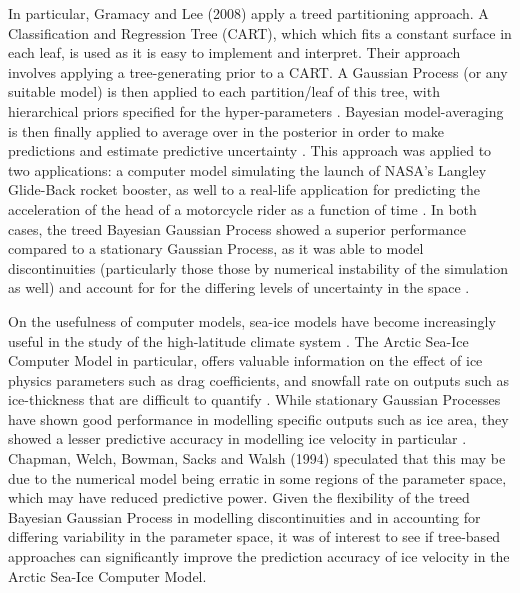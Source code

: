 \documentclass{article}\usepackage[]{graphicx}\usepackage[]{color}
\begin{document}
\vspace{1em}

In particular, Gramacy and Lee (2008) apply a treed partitioning approach. A Classification and Regression Tree (CART), which which fits a constant surface in each leaf, is used as it is easy to implement and interpret. Their approach involves applying a tree-generating prior to a CART. A Gaussian Process (or any suitable model) is then applied to each partition/leaf of this tree, with hierarchical priors specified for the hyper-parameters \cite{gramacy_lee_2008}. Bayesian model-averaging is then finally applied to average over in the posterior in order to make predictions and estimate predictive uncertainty \cite{gramacy_lee_2008}. This approach was applied to two applications: a computer model simulating the launch of NASA's Langley Glide-Back rocket booster, as well to a real-life application for predicting the acceleration of the head of a motorcycle rider as a function of time \cite{gramacy_lee_2008}. In both cases, the treed Bayesian Gaussian Process showed a superior performance compared to a stationary Gaussian Process, as it was able to model discontinuities (particularly those those by numerical instability of the simulation as well) and account for for the differing levels of uncertainty in the space \cite{gramacy_lee_2008}.

\vspace{1em}
On the usefulness of computer models, sea-ice models have become increasingly useful in the study of the high-latitude climate system \cite{chapman_1994}. The Arctic Sea-Ice Computer Model in particular, offers valuable information on the effect of ice physics parameters such as drag coefficients, and snowfall rate on outputs such as ice-thickness that are difficult to quantify \cite{chapman_1994}. While stationary Gaussian Processes have shown good performance in modelling specific outputs such as ice area, they showed a lesser predictive accuracy in modelling ice velocity in particular \cite{chapman_1994}. Chapman, Welch, Bowman, Sacks and Walsh (1994) speculated that this may be due to the numerical model being erratic in some regions of the parameter space, which may have reduced predictive power. Given the flexibility of the treed Bayesian Gaussian Process in modelling discontinuities and in accounting for differing variability in the parameter space, it was of interest to see if tree-based approaches can significantly improve the prediction accuracy of ice velocity in the Arctic Sea-Ice Computer Model. 
\end{document}
